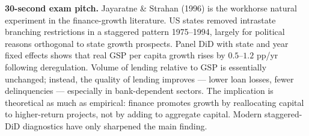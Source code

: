 \documentclass[11pt]{article}
\begin{document}
\begin{keybox}
\textbf{30-second exam pitch.} Jayaratne \& Strahan (1996) is the workhorse natural experiment in the finance-growth literature. US states removed intrastate branching restrictions in a staggered pattern 1975--1994, largely for political reasons orthogonal to state growth prospects. Panel DiD with state and year fixed effects shows that real GSP per capita growth rises by $0.5$--$1.2$ pp/yr following deregulation. Volume of lending relative to GSP is essentially unchanged; instead, the quality of lending improves --- lower loan losses, fewer delinquencies --- especially in bank-dependent sectors. The implication is theoretical as much as empirical: finance promotes growth by reallocating capital to higher-return projects, not by adding to aggregate capital. Modern staggered-DiD diagnostics have only sharpened the main finding.
\end{keybox}
\end{document}
